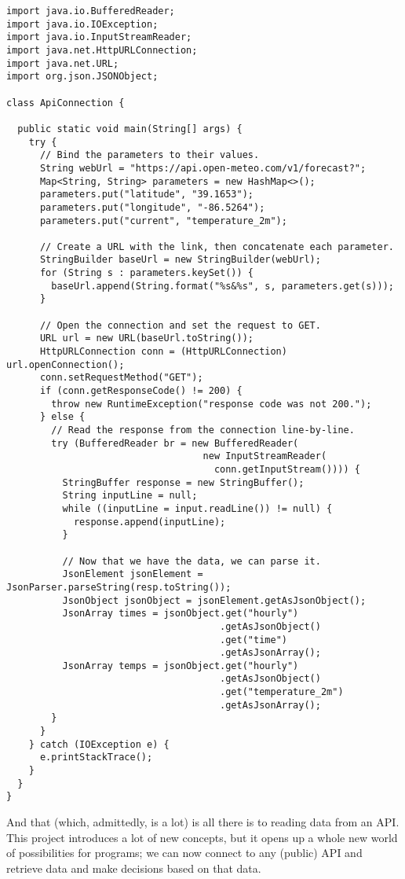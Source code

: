 \begin{lstlisting}[language=MyJava]
import java.io.BufferedReader;
import java.io.IOException;
import java.io.InputStreamReader;
import java.net.HttpURLConnection;
import java.net.URL;
import org.json.JSONObject;

class ApiConnection {

  public static void main(String[] args) {
    try {
      // Bind the parameters to their values.
      String webUrl = "https://api.open-meteo.com/v1/forecast?";
      Map<String, String> parameters = new HashMap<>();
      parameters.put("latitude", "39.1653");
      parameters.put("longitude", "-86.5264");
      parameters.put("current", "temperature_2m");

      // Create a URL with the link, then concatenate each parameter.
      StringBuilder baseUrl = new StringBuilder(webUrl);
      for (String s : parameters.keySet()) { 
        baseUrl.append(String.format("%s&%s", s, parameters.get(s))); 
      }
    
      // Open the connection and set the request to GET.
      URL url = new URL(baseUrl.toString());
      HttpURLConnection conn = (HttpURLConnection) url.openConnection();
      conn.setRequestMethod("GET");
      if (conn.getResponseCode() != 200) {
        throw new RuntimeException("response code was not 200.");
      } else {
        // Read the response from the connection line-by-line.
        try (BufferedReader br = new BufferedReader(
                                   new InputStreamReader(
                                     conn.getInputStream()))) {
          StringBuffer response = new StringBuffer();
          String inputLine = null;
          while ((inputLine = input.readLine()) != null) {
            response.append(inputLine); 
          }

          // Now that we have the data, we can parse it.
          JsonElement jsonElement = JsonParser.parseString(resp.toString());
          JsonObject jsonObject = jsonElement.getAsJsonObject();
          JsonArray times = jsonObject.get("hourly")
                                      .getAsJsonObject()
                                      .get("time")
                                      .getAsJsonArray();
          JsonArray temps = jsonObject.get("hourly")
                                      .getAsJsonObject()
                                      .get("temperature_2m")
                                      .getAsJsonArray();
        }
      }
    } catch (IOException e) {
      e.printStackTrace();
    }
  }
}
\end{lstlisting}

And that (which, admittedly, is a lot) is all there is to reading data from an API. This project introduces a lot of new concepts, but it opens up a whole new world of possibilities for programs; we can now connect to any (public) API and retrieve data and make decisions based on that data.